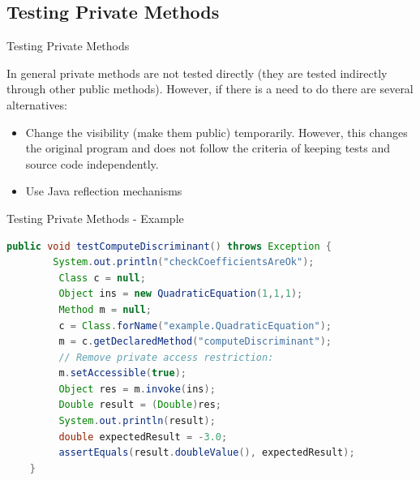 \documentclass[11pt, xcolor=svgnames]{beamer}
\begin{document}
\subsection{Testing Private Methods}


\begin{frame}{Testing Private Methods}

In general private methods are not tested directly (they are tested indirectly through other public methods). However, if there is a need to do there are several alternatives:

\begin{itemize}
 \item Change the visibility (make them public) temporarily. However, this changes the original program and does not follow the criteria of keeping tests and source code independently.
 \item Use Java reflection mechanisms
\end{itemize}


\end{frame}


\begin{frame}[fragile]{Testing Private Methods - Example}

\begin{lstlisting}[language=Java,basicstyle=\tiny]
    public void testComputeDiscriminant() throws Exception {
        System.out.println("checkCoefficientsAreOk");
         Class c = null;
         Object ins = new QuadraticEquation(1,1,1);
         Method m = null;
         c = Class.forName("example.QuadraticEquation");
         m = c.getDeclaredMethod("computeDiscriminant");
         // Remove private access restriction:
         m.setAccessible(true);
         Object res = m.invoke(ins);
         Double result = (Double)res;
         System.out.println(result);
         double expectedResult = -3.0;
         assertEquals(result.doubleValue(), expectedResult);
    }
\end{lstlisting}

\end{frame}

\end{document}
